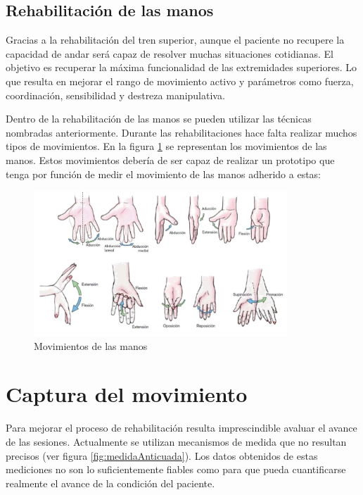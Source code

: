 \subsection{Rehabilitación de las manos}
\label{sec:Rehabilitacion2}

Gracias a la rehabilitación del tren superior, aunque el paciente no recupere la capacidad de andar será capaz de resolver muchas situaciones cotidianas. El objetivo es recuperar la máxima funcionalidad de las extremidades superiores. Lo que resulta en mejorar el rango de movimiento activo y parámetros como fuerza, coordinación, sensibilidad y destreza manipulativa.

Dentro de la rehabilitación de las manos se pueden utilizar las técnicas nombradas anteriormente. Durante las rehabilitaciones hace falta realizar muchos tipos de movimientos. En la figura \ref{fig:movManos} se representan los movimientos de las manos. Estos movimientos debería de ser capaz de realizar un prototipo que tenga por función de medir el movimiento de las manos adherido a estas:

\begin{figure}[H]
	\centering
	\includegraphics[width=0.85\textwidth]{./img/ejerciciosRehManp}
	\caption{Movimientos de las manos \cite{movimientoMano}} 
	\label{fig:movManos}
\end{figure}




\section{Captura del movimiento}
\label{sec:captura2}

Para mejorar el proceso de rehabilitación resulta imprescindible avaluar el avance de las sesiones. Actualmente se utilizan mecanismos de medida que no resultan precisos (ver figura \ref{fig:medidaAnticuada}). Los datos obtenidos de estas mediciones no son lo suficientemente fiables como para que pueda cuantificarse realmente el avance de la condición del paciente.

